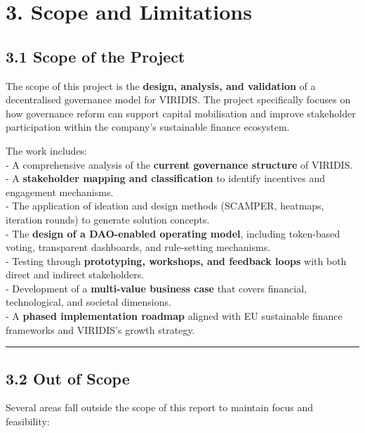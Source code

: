 \documentclass[
  english,
  12pt,
  oneside,
  open=any]{scrbook}
\begin{document}
\chapter{3. Scope and Limitations}\label{sec-scope}

\section{3.1 Scope of the Project}\label{sec-in}

The scope of this project is the \textbf{design, analysis, and
validation} of a decentralised governance model for VIRIDIS. The project
specifically focuses on how governance reform can support capital
mobilisation and improve stakeholder participation within the company's
sustainable finance ecosystem.

The work includes:\\
- A comprehensive analysis of the \textbf{current governance structure}
of VIRIDIS.\\
- A \textbf{stakeholder mapping and classification} to identify
incentives and engagement mechanisms.\\
- The application of ideation and design methods (SCAMPER, heatmaps,
iteration rounds) to generate solution concepts.\\
- The \textbf{design of a DAO-enabled operating model}, including
token-based voting, transparent dashboards, and rule-setting
mechanisms.\\
- Testing through \textbf{prototyping, workshops, and feedback loops}
with both direct and indirect stakeholders.\\
- Development of a \textbf{multi-value business case} that covers
financial, technological, and societal dimensions.\\
- A \textbf{phased implementation roadmap} aligned with EU sustainable
finance frameworks and VIRIDIS's growth strategy.

\begin{center}\rule{0.5\linewidth}{0.5pt}\end{center}

\section{3.2 Out of Scope}\label{sec-out}

Several areas fall outside the scope of this report to maintain focus
and feasibility:
\end{document}
